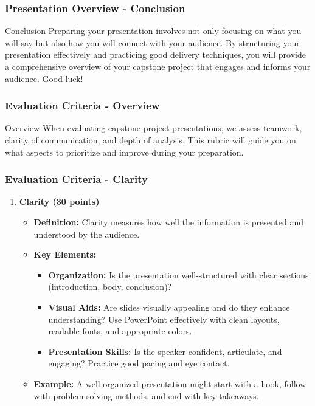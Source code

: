 \documentclass[aspectratio=169]{beamer}
\begin{document}
\begin{frame}[fragile]
    \frametitle{Presentation Overview - Conclusion}
    \begin{block}{Conclusion}
        Preparing your presentation involves not only focusing on what you will say but also how you will connect with your audience. 
        By structuring your presentation effectively and practicing good delivery techniques, 
        you will provide a comprehensive overview of your capstone project that engages and informs your audience. 
        Good luck!
    \end{block}
\end{frame}

\begin{frame}[fragile]
    \frametitle{Evaluation Criteria - Overview}
    \begin{block}{Overview}
        When evaluating capstone project presentations, we assess teamwork, clarity of communication, and depth of analysis. This rubric will guide you on what aspects to prioritize and improve during your preparation.
    \end{block}
\end{frame}

\begin{frame}[fragile]
    \frametitle{Evaluation Criteria - Clarity}
    \begin{enumerate}
        \item \textbf{Clarity (30 points)} 
            \begin{itemize}
                \item \textbf{Definition:} Clarity measures how well the information is presented and understood by the audience.
                \item \textbf{Key Elements:}
                    \begin{itemize}
                        \item \textbf{Organization:} Is the presentation well-structured with clear sections (introduction, body, conclusion)?
                        \item \textbf{Visual Aids:} Are slides visually appealing and do they enhance understanding? Use PowerPoint effectively with clean layouts, readable fonts, and appropriate colors.
                        \item \textbf{Presentation Skills:} Is the speaker confident, articulate, and engaging? Practice good pacing and eye contact.
                    \end{itemize}
                \item \textbf{Example:} A well-organized presentation might start with a hook, follow with problem-solving methods, and end with key takeaways.
            \end{itemize}
    \end{enumerate}
\end{frame}
\end{document}
